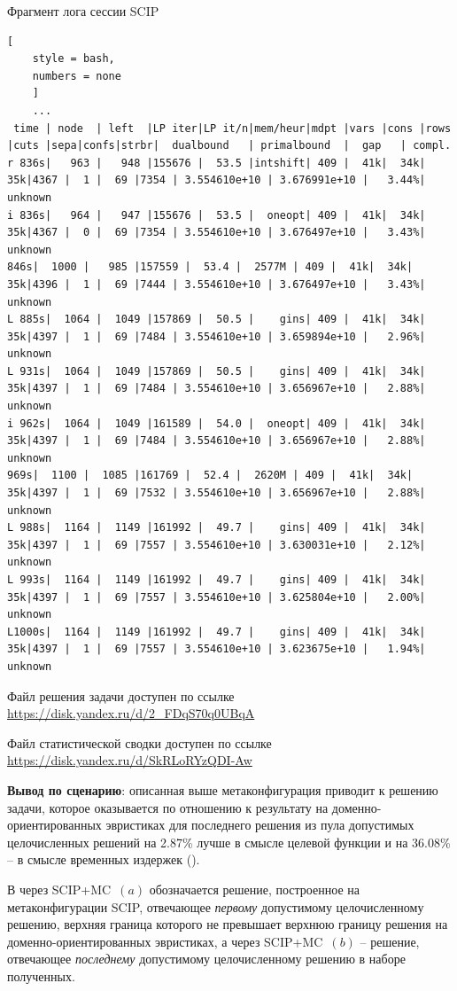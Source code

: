 \documentclass[%
	11pt,
	a4paper,
	utf8,
		]{article}
\begin{document}
Фрагмент лога сессии SCIP
\begin{lstlisting}[
	style = bash,
	numbers = none
	]
	...
 time | node  | left  |LP iter|LP it/n|mem/heur|mdpt |vars |cons |rows |cuts |sepa|confs|strbr|  dualbound   | primalbound  |  gap   | compl. 
r 836s|   963 |   948 |155676 |  53.5 |intshift| 409 |  41k|  34k|  35k|4367 |  1 |  69 |7354 | 3.554610e+10 | 3.676991e+10 |   3.44%| unknown
i 836s|   964 |   947 |155676 |  53.5 |  oneopt| 409 |  41k|  34k|  35k|4367 |  0 |  69 |7354 | 3.554610e+10 | 3.676497e+10 |   3.43%| unknown
846s|  1000 |   985 |157559 |  53.4 |  2577M | 409 |  41k|  34k|  35k|4396 |  1 |  69 |7444 | 3.554610e+10 | 3.676497e+10 |   3.43%| unknown
L 885s|  1064 |  1049 |157869 |  50.5 |    gins| 409 |  41k|  34k|  35k|4397 |  1 |  69 |7484 | 3.554610e+10 | 3.659894e+10 |   2.96%| unknown
L 931s|  1064 |  1049 |157869 |  50.5 |    gins| 409 |  41k|  34k|  35k|4397 |  1 |  69 |7484 | 3.554610e+10 | 3.656967e+10 |   2.88%| unknown
i 962s|  1064 |  1049 |161589 |  54.0 |  oneopt| 409 |  41k|  34k|  35k|4397 |  1 |  69 |7484 | 3.554610e+10 | 3.656967e+10 |   2.88%| unknown
969s|  1100 |  1085 |161769 |  52.4 |  2620M | 409 |  41k|  34k|  35k|4397 |  1 |  69 |7532 | 3.554610e+10 | 3.656967e+10 |   2.88%| unknown
L 988s|  1164 |  1149 |161992 |  49.7 |    gins| 409 |  41k|  34k|  35k|4397 |  1 |  69 |7557 | 3.554610e+10 | 3.630031e+10 |   2.12%| unknown
L 993s|  1164 |  1149 |161992 |  49.7 |    gins| 409 |  41k|  34k|  35k|4397 |  1 |  69 |7557 | 3.554610e+10 | 3.625804e+10 |   2.00%| unknown
L1000s|  1164 |  1149 |161992 |  49.7 |    gins| 409 |  41k|  34k|  35k|4397 |  1 |  69 |7557 | 3.554610e+10 | 3.623675e+10 |   1.94%| unknown
\end{lstlisting}

Файл решения задачи доступен по ссылке \url{https://disk.yandex.ru/d/2_FDqS70q0UBqA}

Файл статистической сводки доступен по ссылке \url{https://disk.yandex.ru/d/SkRLoRYzQDI-Aw}

\vspace*{3mm}
\textbf{Вывод по сценарию}: описанная выше метаконфигурация приводит к решению задачи, которое оказывается по отношению к результату на доменно-ориентированных эвристиках для последнего решения из пула допустимых целочисленных решений на 2.87\% лучше в смысле целевой функции и на 36.08\% -- в смысле временных издержек ().

В   через SCIP+MC~$ (a) $ обозначается решение, построенное на метаконфигурации SCIP, отвечающее \emph{первому} допустимому целочисленному решению, верхняя граница которого не превышает верхнюю границу решения на доменно-ориентированных эвристиках, а через SCIP+MC~$ (b) $ -- решение, отвечающее \emph{последнему} допустимому целочисленному решению в наборе полученных.
\end{document}
